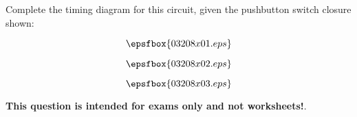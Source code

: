 

Complete the timing diagram for this circuit, given the pushbutton switch closure shown:

$$\epsfbox{03208x01.eps}$$

$$\epsfbox{03208x02.eps}$$







$$\epsfbox{03208x03.eps}$$







{\bf This question is intended for exams only and not worksheets!}.




